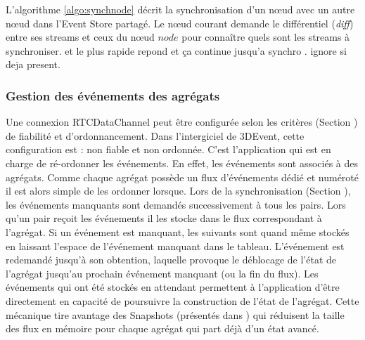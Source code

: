 L'algorithme \ref{algo:synchnode} décrit la synchronisation d'un n\oe ud avec un 
autre n\oe ud dans l'Event Store partagé. Le n\oe ud courant demande le 
différentiel (\textit{diff}) entre ses streams et ceux du n\oe ud $node$ pour 
connaître quels sont les streams à synchroniser. 
et le plus rapide repond et ça continue jusqu’a synchro . ignore si deja present.





\subsubsection{Gestion des événements des agrégats}

Une connexion RTCDataChannel peut être configurée selon 
les critères (Section ) de fiabilité et d'ordonnancement. 
Dans l'intergiciel de 3DEvent, cette configuration est : non fiable et non ordonnée. 
C'est l'application qui est en charge de \og ré-ordonner\fg{} les événements. En 
effet, les événements sont associés à des agrégats. Comme chaque agrégat 
possède un flux d'événements dédié et numéroté il est alors simple de les 
ordonner lorsque. 
Lors de la synchronisation (Section ), les 
événements manquants sont demandés successivement à tous les pairs. Lors 
qu'un pair reçoit les événements il les stocke dans le flux correspondant à 
l'agrégat. Si un événement est manquant, les suivants sont quand même stockés 
en laissant l'espace de l'événement manquant dans le tableau. L'événement est 
redemandé jusqu'à son obtention, laquelle provoque le déblocage de l'état de 
l'agrégat jusqu'au prochain événement manquant (ou la fin du flux). Les 
événements qui ont été stockés \og en attendant\fg{} permettent à l'application 
d'être directement en capacité de poursuivre la construction de l'état de l'agrégat. 
Cette mécanique tire avantage des Snapshots (présentés dans ) 
qui réduisent la taille des flux en mémoire pour chaque agrégat qui part déjà d'un 
état avancé.


